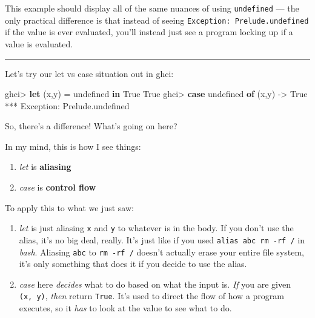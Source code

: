 \documentclass[]{article}
\newenvironment{Shaded}{}{}
\newcommand{\DataTypeTok}[1]{\textcolor[rgb]{0.56,0.13,0.00}{#1}}
\newcommand{\FunctionTok}[1]{\textcolor[rgb]{0.02,0.16,0.49}{#1}}
\newcommand{\KeywordTok}[1]{\textcolor[rgb]{0.00,0.44,0.13}{\textbf{#1}}}
\newcommand{\NormalTok}[1]{#1}
\newcommand{\OperatorTok}[1]{\textcolor[rgb]{0.40,0.40,0.40}{#1}}
\newcommand{\OtherTok}[1]{\textcolor[rgb]{0.00,0.44,0.13}{#1}}
\begin{document}
This example should display all of the same nuances of using \texttt{undefined}
--- the only practical difference is that instead of seeing
\texttt{Exception:\ Prelude.undefined} if the value is ever evaluated, you'll
instead just see a program locking up if a value is evaluated.

\begin{center}\rule{0.5\linewidth}{\linethickness}\end{center}

Let's try our let vs case situation out in ghci:

\begin{Shaded}
\begin{Highlighting}[]
\NormalTok{ghci}\OperatorTok{>} \KeywordTok{let}\NormalTok{ (x,y) }\OtherTok{=} \FunctionTok{undefined} \KeywordTok{in} \DataTypeTok{True}
\DataTypeTok{True}
\NormalTok{ghci}\OperatorTok{>} \KeywordTok{case} \FunctionTok{undefined} \KeywordTok{of}\NormalTok{ (x,y) }\OtherTok{{-}>} \DataTypeTok{True}
\OperatorTok{***} \DataTypeTok{Exception}\OperatorTok{:}\NormalTok{ Prelude.undefined}
\end{Highlighting}
\end{Shaded}

So, there's a difference! What's going on here?

In my mind, this is how I see things:

\begin{enumerate}
\def\labelenumi{\arabic{enumi}.}
\tightlist
\item
  \emph{let} is \textbf{aliasing}
\item
  \emph{case} is \textbf{control flow}
\end{enumerate}

To apply this to what we just saw:

\begin{enumerate}
\def\labelenumi{\arabic{enumi}.}
\item
  \emph{let} is just aliasing \texttt{x} and \texttt{y} to whatever is in the
  body. If you don't use the alias, it's no big deal, really. It's just like if
  you used \texttt{alias\ abc\ rm\ -rf\ /} in \emph{bash}. Aliasing \texttt{abc}
  to \texttt{rm\ -rf\ /} doesn't actually erase your entire file system, it's
  only something that does it if you decide to use the alias.
\item
  \emph{case} here \emph{decides} what to do based on what the input is.
  \emph{If} you are given \texttt{(x,\ y)}, \emph{then} return \texttt{True}.
  It's used to direct the flow of how a program executes, so it \emph{has} to
  look at the value to see what to do.
\end{enumerate}
\end{document}
